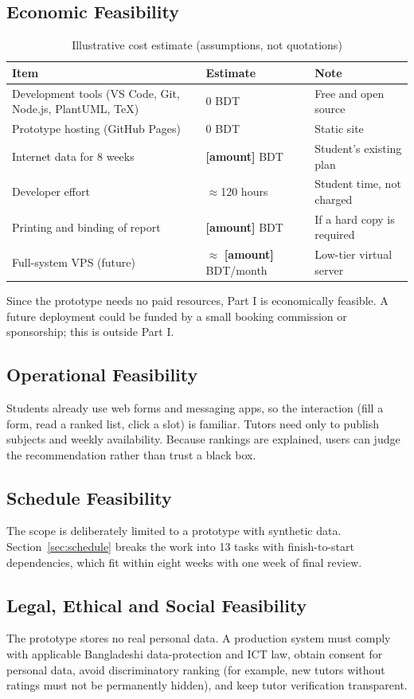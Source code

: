 \documentclass[11pt,a4paper]{article}
\newcommand{\ph}[1]{\textcolor{placeholder}{\textbf{[#1]}}}
\begin{document}
\subsection{Economic Feasibility}
\begin{table}[H]
\centering
\caption{Illustrative cost estimate (assumptions, not quotations)}
\small
\begin{tabularx}{\linewidth}{@{}X l X@{}}
\toprule
\textbf{Item} & \textbf{Estimate} & \textbf{Note}\\ \midrule
Development tools (VS Code, Git, Node.js, PlantUML, TeX) & 0 BDT & Free and open source\\
Prototype hosting (GitHub Pages) & 0 BDT & Static site\\
Internet data for 8 weeks & \ph{amount} BDT & Student's existing plan\\
Developer effort & $\approx$120 hours & Student time, not charged\\
Printing and binding of report & \ph{amount} BDT & If a hard copy is required\\
Full-system VPS (future) & $\approx$ \ph{amount} BDT/month & Low-tier virtual server\\
\bottomrule
\end{tabularx}
\end{table}
Since the prototype needs no paid resources, Part I is economically feasible. A future deployment could be funded by a small booking commission or sponsorship; this is outside Part I.

\subsection{Operational Feasibility}
Students already use web forms and messaging apps, so the interaction (fill a form, read a ranked list, click a slot) is familiar. Tutors need only to publish subjects and weekly availability. Because rankings are explained, users can judge the recommendation rather than trust a black box.

\subsection{Schedule Feasibility}
The scope is deliberately limited to a prototype with synthetic data. Section~\ref{sec:schedule} breaks the work into 13 tasks with finish-to-start dependencies, which fit within eight weeks with one week of final review.

\subsection{Legal, Ethical and Social Feasibility}
The prototype stores no real personal data. A production system must comply with applicable Bangladeshi data-protection and ICT law, obtain consent for personal data, avoid discriminatory ranking (for example, new tutors without ratings must not be permanently hidden), and keep tutor verification transparent.
\end{document}

